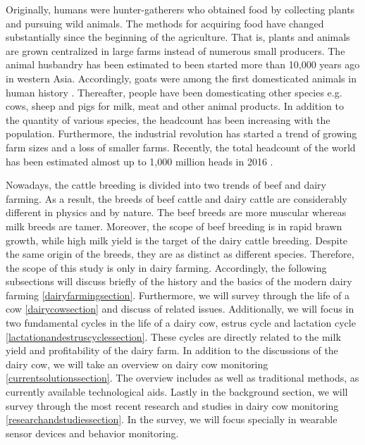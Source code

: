 \documentclass[english,12pt,a4paper,pdftex,elec,utf8]{aaltothesis}
\begin{document}
Originally, humans were hunter-gatherers who obtained food by collecting plants and pursuing wild animals. The methods for acquiring food have changed substantially since the beginning of the agriculture. That is, plants and animals are grown centralized in large farms instead of numerous small producers. The animal husbandry has been estimated to been started more than 10,000 years ago in western Asia. Accordingly, goats were among the first domesticated animals in human history \cite{ancienthistoryofmilk}. Thereafter, people have been domesticating other species e.g. cows, sheep and pigs for milk, meat and other animal products. In addition to the quantity of various species, the headcount has been increasing with the population. Furthermore, the industrial revolution has started a trend of growing farm sizes and a loss of smaller farms. Recently, the total headcount of the world has been estimated almost up to 1,000 million heads in 2016 \cite{livestockandpoultry}.

Nowadays, the cattle breeding is divided into two trends of beef and dairy farming. As a result, the breeds of beef cattle and dairy cattle are considerably different in physics and by nature. The beef breeds are more muscular whereas milk breeds are tamer. Moreover, the scope of beef breeding is in rapid brawn growth, while high milk yield is the target of the dairy cattle breeding. Despite the same origin of the breeds, they are as distinct as different species. Therefore, the scope of this study is only in dairy farming. Accordingly, the following subsections will discuss briefly of the history and the basics of the modern dairy farming \ref{dairyfarmingsection}. Furthermore, we will survey through the life of a cow \ref{dairycowsection} and discuss of related issues. Additionally, we will focus in two fundamental cycles in the life of a dairy cow, estrus cycle and lactation cycle \ref{lactationandestruscyclessection}. These cycles are directly related to the milk yield and profitability of the dairy farm. In addition to the discussions of the dairy cow, we will take an overview on dairy cow monitoring \ref{currentsolutionssection}. The overview includes as well as traditional methods, as currently available technological aids. Lastly in the background section, we will survey through the most recent research and studies in dairy cow monitoring \ref{researchandstudiessection}. In the survey, we will focus specially in wearable sensor devices and behavior monitoring.

\end{document}
